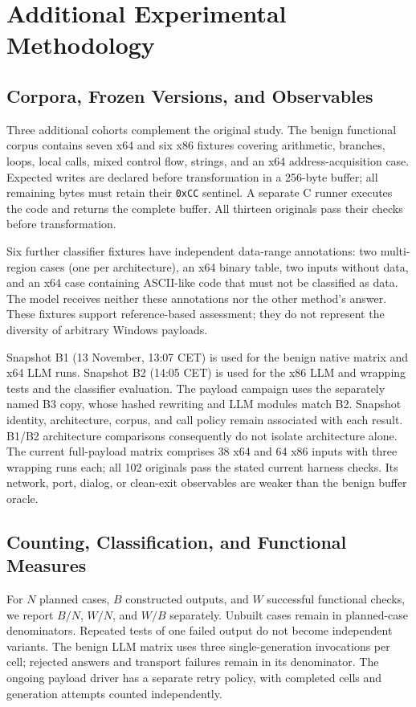 \section{Additional Experimental Methodology}\label{sec:methodology}
\subsection{Corpora, Frozen Versions, and Observables}
Three additional cohorts complement the original study. The benign
functional corpus contains seven x64 and six x86 fixtures covering
arithmetic, branches, loops, local calls, mixed control flow, strings,
and an x64 address-acquisition case. Expected writes are declared
before transformation in a 256-byte buffer; all remaining bytes must
retain their \texttt{0xCC} sentinel. A separate C runner executes the
code and returns the complete buffer. All thirteen originals pass
their checks before transformation.

Six further classifier fixtures have independent data-range annotations:
two multi-region cases (one per architecture), an x64 binary table,
two inputs without data, and an x64 case containing ASCII-like code
that must not be classified as data. The model receives neither these
annotations nor the other method's answer. These fixtures support
reference-based assessment; they do not represent the diversity of
arbitrary Windows payloads.

Snapshot B1 (13 November, 13:07 CET) is used for the benign native
matrix and x64 LLM runs. Snapshot B2 (14:05 CET) is used for the
x86 LLM and wrapping tests and the classifier evaluation.
The payload campaign uses the separately named B3 copy, whose hashed
rewriting and LLM modules match B2. Snapshot identity, architecture,
corpus, and call policy remain associated with each result. B1/B2
architecture comparisons consequently do not isolate architecture
alone. The current full-payload matrix comprises 38 x64 and 64 x86
inputs with three wrapping runs each; all 102 originals pass the
stated current harness checks. Its network, port, dialog, or clean-exit
observables are weaker than the benign buffer oracle.

\subsection{Counting, Classification, and Functional Measures}
For $N$ planned cases, $B$ constructed outputs, and $W$ successful
functional checks, we report $B/N$, $W/N$, and $W/B$ separately.
Unbuilt cases remain in planned-case denominators. Repeated tests of
one failed output do not become independent variants. The benign LLM
matrix uses three single-generation invocations per cell; rejected
answers and transport failures remain in its denominator. The ongoing
payload driver has a separate retry policy, with completed cells and
generation attempts counted independently.


